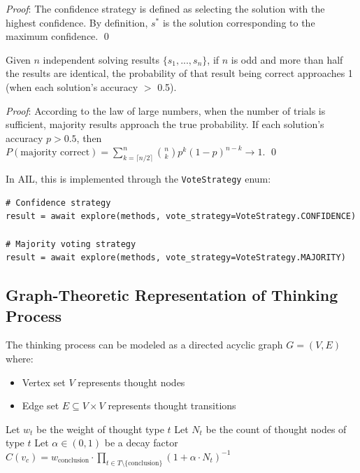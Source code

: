 \documentclass[12pt,a4paper]{article}
\begin{document}
\textit{Proof}: The confidence strategy is defined as selecting the solution with the highest confidence. By definition, $s^*$ is the solution corresponding to the maximum confidence. \qed

\begin{theorem}
Given $n$ independent solving results $\{s_1, ..., s_n\}$, if $n$ is odd and more than half the results are identical, the probability of that result being correct approaches 1 (when each solution's accuracy $>$ 0.5).
\end{theorem}

\textit{Proof}: According to the law of large numbers, when the number of trials is sufficient, majority results approach the true probability. If each solution's accuracy $p > 0.5$, then $P(\text{majority correct}) = \sum_{k=\lceil n/2 \rceil}^{n} \binom{n}{k} p^k (1-p)^{n-k} \to 1$. \qed

In AIL, this is implemented through the \texttt{VoteStrategy} enum:

\begin{verbatim}
# Confidence strategy
result = await explore(methods, vote_strategy=VoteStrategy.CONFIDENCE)

# Majority voting strategy
result = await explore(methods, vote_strategy=VoteStrategy.MAJORITY)
\end{verbatim}

\subsection{Graph-Theoretic Representation of Thinking Process}

\begin{definition}
The thinking process can be modeled as a directed acyclic graph $G = (V, E)$ where:
\begin{itemize}
\item Vertex set $V$ represents thought nodes
\item Edge set $E \subseteq V \times V$ represents thought transitions
\end{itemize}
\end{definition}

\begin{algorithm}
\caption{Confidence Calculation for Conclusions}
\begin{algorithmic}
\STATE Let $w_t$ be the weight of thought type $t$
\STATE Let $N_t$ be the count of thought nodes of type $t$
\STATE Let $\alpha \in (0, 1)$ be a decay factor
\STATE $C(v_c) = w_{\text{conclusion}} \cdot \prod_{t \in T \setminus \{\text{conclusion}\}} (1 + \alpha \cdot N_t)^{-1}$
\end{algorithmic}
\end{algorithm}
\end{document}
